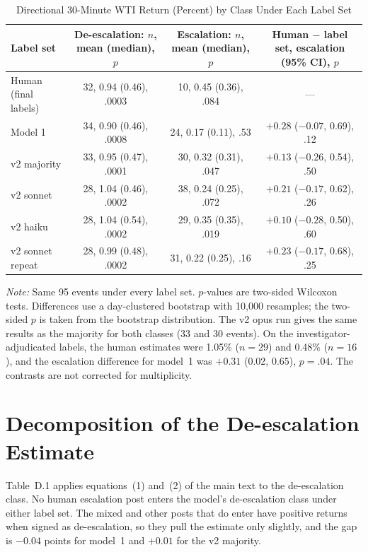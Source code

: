 \documentclass[11pt]{article}
\begin{document}
\begin{table}[h]
\centering
\small
\caption{Directional 30-Minute WTI Return (Percent) by Class Under Each Label Set}
\label{tab:labelsets}
\begin{tabular}{lccc}
\toprule
Label set & De-escalation: $n$, mean (median), $p$ & Escalation: $n$, mean (median), $p$ & Human $-$ label set, escalation (95\% CI), $p$ \\
\midrule
Human (final labels) & 32, 0.94 (0.46), .0003 & 10, 0.45 (0.36), .084 & --- \\
Model 1 & 34, 0.90 (0.46), .0008 & 24, 0.17 (0.11), .53 & $+0.28$ ($-0.07$, 0.69), .12 \\
v2 majority & 33, 0.95 (0.47), .0001 & 30, 0.32 (0.31), .047 & $+0.13$ ($-0.26$, 0.54), .50 \\
v2 sonnet & 28, 1.04 (0.46), .0002 & 38, 0.24 (0.25), .072 & $+0.21$ ($-0.17$, 0.62), .26 \\
v2 haiku & 28, 1.04 (0.54), .0002 & 29, 0.35 (0.35), .019 & $+0.10$ ($-0.28$, 0.50), .60 \\
v2 sonnet repeat & 28, 0.99 (0.48), .0002 & 31, 0.22 (0.25), .16 & $+0.23$ ($-0.17$, 0.68), .25 \\
\bottomrule
\end{tabular}

\vspace{0.5em}
\begin{minipage}{0.95\textwidth}
\footnotesize\textit{Note:} Same 95 events under every label set. $p$-values are two-sided Wilcoxon tests. Differences use a day-clustered bootstrap with 10,000 resamples; the two-sided $p$ is taken from the bootstrap distribution. The v2 opus run gives the same results as the majority for both classes (33 and 30 events). On the investigator-adjudicated labels, the human estimates were 1.05\% ($n = 29$) and 0.48\% ($n = 16$), and the escalation difference for model~1 was $+0.31$ (0.02, 0.65), $p = .04$. The contrasts are not corrected for multiplicity.
\end{minipage}
\end{table}

\section{Decomposition of the De-escalation Estimate}
\label{sec:decomp}

Table~D.1 applies equations~(1) and~(2) of the main text to the de-escalation class. No human escalation post enters the model's de-escalation class under either label set. The mixed and other posts that do enter have positive returns when signed as de-escalation, so they pull the estimate only slightly, and the gap is $-0.04$ points for model~1 and $+0.01$ for the v2 majority.
\end{document}

